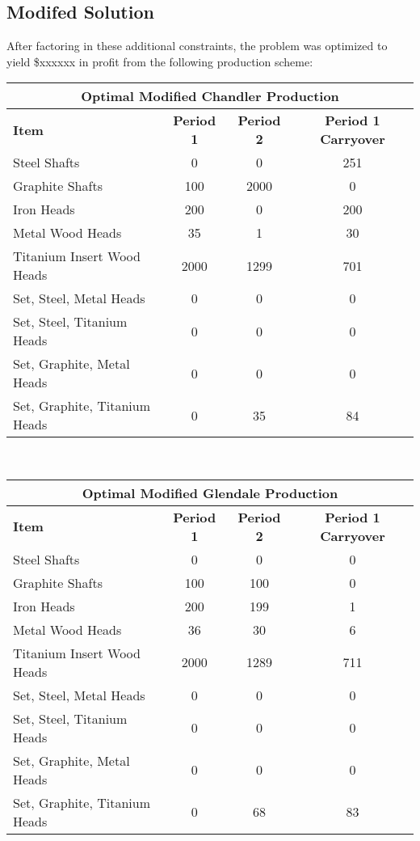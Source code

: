 \documentclass{article}
\begin{document}
\subsection{Modifed Solution}
After factoring in these additional constraints, the problem was optimized to yield \$xxxxxx in profit from the following production scheme:
\\
\noindent
\begin{tabular}{ l c c c }
\hline
\multicolumn{4}{|c|}{Optimal Modified Chandler Production} \\
\hline
\textbf{Item} & \textbf{Period 1} & \textbf{Period 2} & \textbf{Period 1 Carryover} \\
Steel Shafts & 0 & 0 & 251 \\
Graphite Shafts & 100 & 2000 & 0 \\
Iron Heads & 200 & 0 & 200 \\
Metal Wood Heads & 35 & 1 & 30 \\
Titanium Insert Wood Heads & 2000 & 1299 & 701 \\
Set, Steel, Metal Heads & 0 & 0 & 0 \\
Set, Steel, Titanium Heads & 0 & 0 & 0 \\
Set, Graphite, Metal Heads & 0 & 0 & 0 \\
Set, Graphite, Titanium Heads & 0 & 35 & 84\\
\end{tabular}
\vspace{5mm}
\\
\noindent
\begin{tabular}{ l c c c }
\hline
\multicolumn{4}{|c|}{Optimal Modified Glendale Production} \\
\hline
\textbf{Item} & \textbf{Period 1} & \textbf{Period 2} & \textbf{Period 1 Carryover} \\
Steel Shafts & 0 & 0 & 0 \\
Graphite Shafts & 100 & 100 & 0 \\
Iron Heads & 200 & 199 & 1 \\
Metal Wood Heads & 36 & 30 & 6 \\
Titanium Insert Wood Heads & 2000 & 1289 & 711 \\
Set, Steel, Metal Heads & 0 & 0 & 0 \\
Set, Steel, Titanium Heads & 0 & 0 & 0 \\
Set, Graphite, Metal Heads & 0 & 0 & 0 \\
Set, Graphite, Titanium Heads & 0 & 68 & 83\\
\end{tabular}
\end{document}
